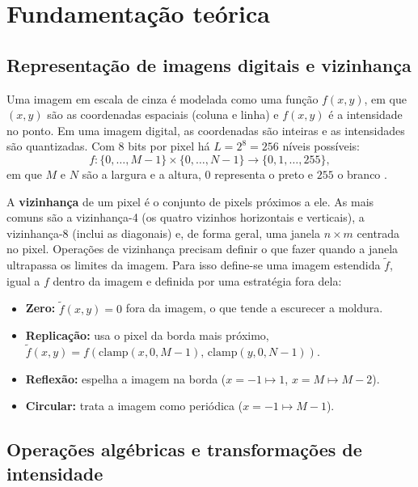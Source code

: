 \documentclass[11pt,a4paper]{article}
\begin{document}
\section{Fundamentação teórica}

\subsection{Representação de imagens digitais e vizinhança}

Uma imagem em escala de cinza é modelada como uma função $f(x, y)$, em que $(x, y)$ são as
coordenadas espaciais (coluna e linha) e $f(x, y)$ é a intensidade no ponto. Em uma imagem
digital, as coordenadas são inteiras e as intensidades são quantizadas. Com 8 bits por pixel
há $L = 2^8 = 256$ níveis possíveis:
\begin{equation}
  f : \{0, \dots, M-1\} \times \{0, \dots, N-1\} \to \{0, 1, \dots, 255\},
\end{equation}
em que $M$ e $N$ são a largura e a altura, $0$ representa o preto e $255$ o branco
\cite{gonzalez}.

A \textbf{vizinhança} de um pixel é o conjunto de pixels próximos a ele. As mais comuns são
a vizinhança-4 (os quatro vizinhos horizontais e verticais), a vizinhança-8 (inclui as
diagonais) e, de forma geral, uma janela $n \times m$ centrada no pixel. Operações de
vizinhança precisam definir o que fazer quando a janela ultrapassa os limites da imagem. Para
isso define-se uma imagem estendida $\tilde f$, igual a $f$ dentro da imagem e definida por
uma estratégia fora dela:
\begin{itemize}
  \item \textbf{Zero:} $\tilde f(x, y) = 0$ fora da imagem, o que tende a escurecer a moldura.
  \item \textbf{Replicação:} usa o pixel da borda mais próximo,
        $\tilde f(x, y) = f(\mathrm{clamp}(x, 0, M-1),\, \mathrm{clamp}(y, 0, N-1))$.
  \item \textbf{Reflexão:} espelha a imagem na borda ($x = -1 \mapsto 1$,
        $x = M \mapsto M - 2$).
  \item \textbf{Circular:} trata a imagem como periódica ($x = -1 \mapsto M - 1$).
\end{itemize}

\subsection{Operações algébricas e transformações de intensidade}
\end{document}
